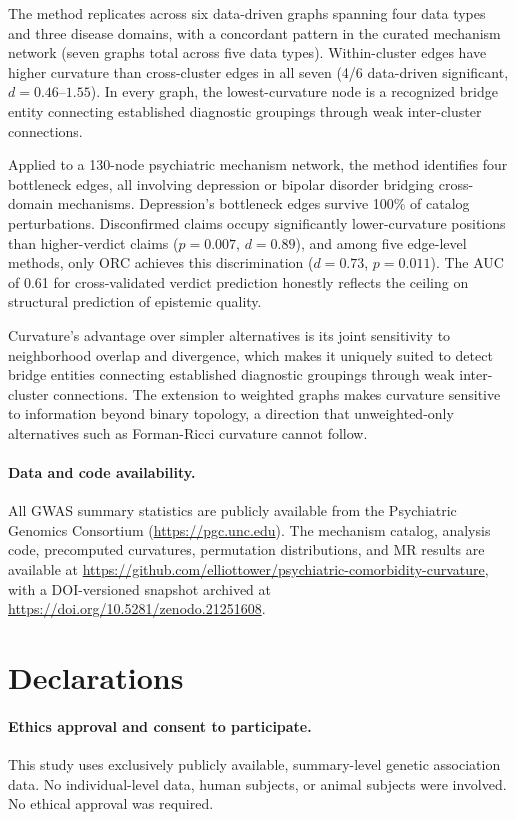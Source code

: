 \documentclass[11pt]{article}
\begin{document}
The method replicates across six data-driven graphs spanning four data types and three disease domains, with a concordant pattern in the curated mechanism network (seven graphs total across five data types). Within-cluster edges have higher curvature than cross-cluster edges in all seven (4/6 data-driven significant, $d = 0.46$--$1.55$). In every graph, the lowest-curvature node is a recognized bridge entity connecting established diagnostic groupings through weak inter-cluster connections.

Applied to a 130-node psychiatric mechanism network, the method identifies four bottleneck edges, all involving depression or bipolar disorder bridging cross-domain mechanisms. Depression's bottleneck edges survive 100\% of catalog perturbations. Disconfirmed claims occupy significantly lower-curvature positions than higher-verdict claims ($p = 0.007$, $d = 0.89$), and among five edge-level methods, only ORC achieves this discrimination ($d = 0.73$, $p = 0.011$). The AUC of 0.61 for cross-validated verdict prediction honestly reflects the ceiling on structural prediction of epistemic quality.

Curvature's advantage over simpler alternatives is its joint sensitivity to neighborhood overlap and divergence, which makes it uniquely suited to detect bridge entities connecting established diagnostic groupings through weak inter-cluster connections. The extension to weighted graphs makes curvature sensitive to information beyond binary topology, a direction that unweighted-only alternatives such as Forman-Ricci curvature \citep{sreejith2016forman} cannot follow.

\paragraph{Data and code availability.} All GWAS summary statistics are publicly available from the Psychiatric Genomics Consortium (\url{https://pgc.unc.edu}). The mechanism catalog, analysis code, precomputed curvatures, permutation distributions, and MR results are available at \url{https://github.com/elliottower/psychiatric-comorbidity-curvature}, with a DOI-versioned snapshot archived at \url{https://doi.org/10.5281/zenodo.21251608}.

\section*{Declarations}

\paragraph{Ethics approval and consent to participate.}
This study uses exclusively publicly available, summary-level genetic association data. No individual-level data, human subjects, or animal subjects were involved. No ethical approval was required.
\end{document}

